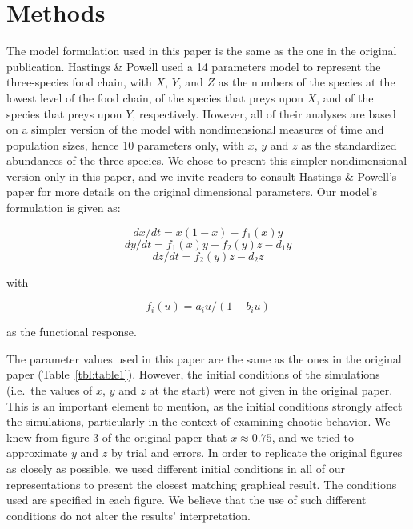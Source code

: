 \documentclass[
]{article}
\begin{document}
\hypertarget{methods}{%
\section{Methods}\label{methods}}

The model formulation used in this paper is the same as the one in the
original publication. Hastings \& Powell used a 14 parameters model to
represent the three-species food chain, with \(X\), \(Y\), and \(Z\) as
the numbers of the species at the lowest level of the food chain, of the
species that preys upon \(X\), and of the species that preys upon \(Y\),
respectively. However, all of their analyses are based on a simpler
version of the model with nondimensional measures of time and population
sizes, hence 10 parameters only, with \(x\), \(y\) and \(z\) as the
standardized abundances of the three species. We chose to present this
simpler nondimensional version only in this paper, and we invite readers
to consult Hastings \& Powell's paper for more details on the original
dimensional parameters. Our model's formulation is given as:

\[ dx/dt = x(1 - x) - f_1(x)y \] \[ dy/dt = f_1(x)y - f_2(y)z - d_1y \]
\begin{equation} dz/dt = f_2(y)z - d_2z \label{eq:1}\end{equation}

with

\begin{equation} f_i(u) = a_iu/(1 + b_iu) \label{eq:2}\end{equation}

as the functional response.

The parameter values used in this paper are the same as the ones in the
original paper (Table~\ref{tbl:table1}). However, the initial conditions
of the simulations (i.e.~the values of \(x\), \(y\) and \(z\) at the
start) were not given in the original paper. This is an important
element to mention, as the initial conditions strongly affect the
simulations, particularly in the context of examining chaotic behavior.
We knew from figure 3 of the original paper that \(x \approx 0.75\), and
we tried to approximate \(y\) and \(z\) by trial and errors. In order to
replicate the original figures as closely as possible, we used different
initial conditions in all of our representations to present the closest
matching graphical result. The conditions used are specified in each
figure. We believe that the use of such different conditions do not
alter the results' interpretation.
\end{document}
